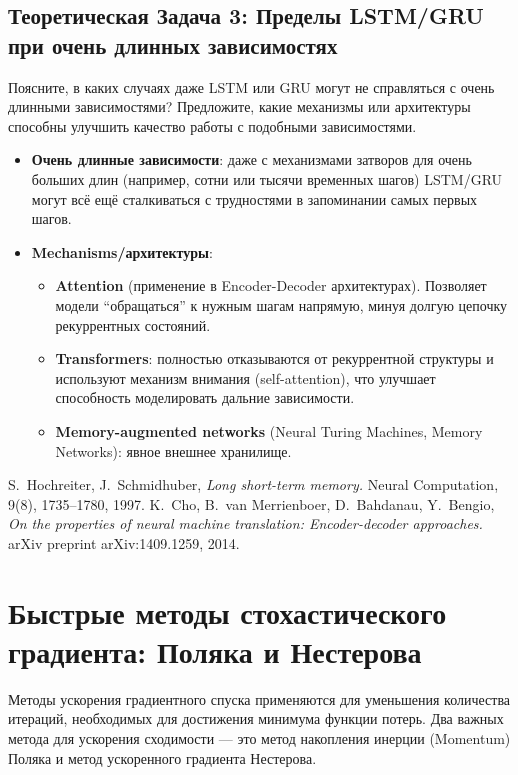 \subsection{Теоретическая Задача 3: Пределы LSTM/GRU при очень длинных зависимостях}

Поясните, в каких случаях даже LSTM или GRU могут не справляться с очень длинными зависимостями? Предложите, какие механизмы или архитектуры способны улучшить качество работы с подобными зависимостями.

\begin{itemize}
    \item \textbf{Очень длинные зависимости}: даже с механизмами затворов для очень больших длин (например, сотни или тысячи временных шагов) LSTM/GRU могут всё ещё сталкиваться с трудностями в запоминании самых первых шагов. 
    \item \textbf{Mechanisms/архитектуры}: 
    \begin{itemize}
        \item \textbf{Attention} (применение в Encoder-Decoder архитектурах). Позволяет модели ``обращаться'' к нужным шагам напрямую, минуя долгую цепочку рекуррентных состояний.
        \item \textbf{Transformers}: полностью отказываются от рекуррентной структуры и используют механизм внимания (self-attention), что улучшает способность моделировать дальние зависимости.
        \item \textbf{Memory-augmented networks} (Neural Turing Machines, Memory Networks): явное внешнее хранилище.
    \end{itemize}
\end{itemize} 

\begin{thebibliography}{99}
 S.~Hochreiter, J.~Schmidhuber, \textit{Long short-term memory.} Neural Computation, 9(8), 1735--1780, 1997.
 K.~Cho, B.~van Merrienboer, D.~Bahdanau, Y.~Bengio, \textit{On the properties of neural machine translation: Encoder-decoder approaches.} arXiv preprint arXiv:1409.1259, 2014.
\end{thebibliography}

\section*{Быстрые методы стохастического градиента: Поляка и Нестерова}

Методы ускорения градиентного спуска применяются для уменьшения количества итераций, необходимых для достижения минимума функции потерь. Два важных метода для ускорения сходимости — это метод накопления инерции (Momentum) Поляка и метод ускоренного градиента Нестерова.


